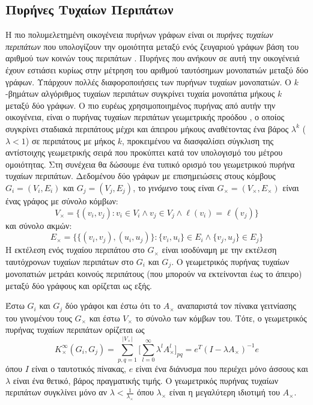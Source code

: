 \subsection{Πυρήνες Τυχαίων Περιπάτων}
\label{ssec:rw}
Η πιο πολυμελετημένη οικογένεια πυρήνων γράφων είναι οι \textit{πυρήνες τυχαίων περιπάτων} που υπολογίζουν την ομοιότητα μεταξύ ενός ζευγαριού γράφων βάση του αριθμού των κοινών τους περιπάτων \cite{kashima2003marginalized,gartner2003graph,mahe2004extensions,borgwardt2005protein,vishwanathan2010graph,sugiyama2015halting}.
Πυρήνες που ανήκουν σε αυτή την οικογένειά έχουν εστιάσει κυρίως στην μέτρηση του αριθμού ταυτόσημων μονοπατιών μεταξύ δύο γράφων.
Υπάρχουν πολλές διαφοροποιήσεις των πυρήνων τυχαίων μονοπατιών.
Ο $k$-βημάτων αλγόριθμος τυχαίων περιπάτων συγκρίνει τυχαία μονοπάτια μήκους $k$ μεταξύ δύο γράφων.
Ο πιο ευρέως χρησιμοποιημένος πυρήνας από αυτήν την οικογένεια, είναι ο πυρήνας τυχαίων περιπάτων γεωμετρικής προόδου \cite{gartner2003graph}, ο οποίος συγκρίνει σταδιακά περιπάτους μέχρι και άπειρου μήκους αναθέτοντας ένα βάρος $\lambda^k$ ($\lambda < 1$) σε περιπάτους με μήκος $k$, προκειμένου να διασφαλίσει σύγκλιση της αντίστοιχης γεωμετρικής σειρά που προκύπτει κατά τον υπολογισμό του μέτρου ομοιότητας.
Στη συνέχεια θα δώσουμε ένα τυπικό ορισμό του γεωμετρικού πυρήνα τυχαίων περιπάτων.
Δεδομένου δύο γράφων με επισημειώσεις στους κόμβους $G_i=(V_i,E_i)$ και $G_j=(V_j,E_j)$, το \textit{γινόμενο} τους είναι $G_\times=(V_\times,E_\times)$ είναι ένας γράφος με σύνολο κόμβων:
\begin{equation}
	V_{\times} = \{(v_i,v_j) : v_i \in V_i \wedge v_j \in V_j \wedge \ell(v_i) = \ell(v_j) \} 
\end{equation}
και σύνολο ακμών:
\begin{equation}
	E_{\times} = \{\{(v_i,v_j),(u_i,u_j)\} : \{v_i,u_i\} \in E_i \wedge \{v_j,u_j\} \in E_j\}
\end{equation}
Η εκτέλεση ενός τυχαίου περιπάτου στο $G_{\times}$ είναι ισοδύναμη με την εκτέλεση ταυτόχρονων τυχαίων περιπάτων στο $G_i$ και $G_j$.
Ο γεωμετρικός πυρήνας τυχαίων μονοπατιών μετράει κοινούς περιπάτους (που μπορούν να εκτείνονται έως το άπειρο) μεταξύ δύο γράφους και ορίζεται ως εξής.
\begin{definition}
	Έστω $G_i$ και $G_j$ δύο γράφοι και έστω ότι το $A_\times$ αναπαριστά τον πίνακα γειτνίασης του γινομένου τους $G_\times$ και έστω $V_\times$ το σύνολο των κόμβων του.
	Τότε, ο γεωμετρικός πυρήνας τυχαίων περιπάτων ορίζεται ως
	\begin{equation}
    	K_{\times}^{\infty}(G_i,G_j) = \sum_{p,q=1}^{|V_{\times}|} \Big[ \sum_{l=0}^{\infty} \lambda^l A_{\times}^l \Big]_{pq} = e^T(I - \lambda A_{\times})^{-1} e
    \end{equation}
	όπου $I$ είναι ο ταυτοτικός πίνακας, $e$ είναι ένα διάνυσμα που περιέχει μόνο άσσους και $\lambda$ είναι ένα θετικό, βάρος πραγματικής τιμής.
	Ο γεωμετρικός πυρήνας τυχαίων περιπάτων συγκλίνει μόνο αν  $\lambda < \frac{1}{\lambda_\times}$ όπου $\lambda_\times$ είναι η μεγαλύτερη ιδιοτιμή του $A_{\times}$.
\end{definition}
